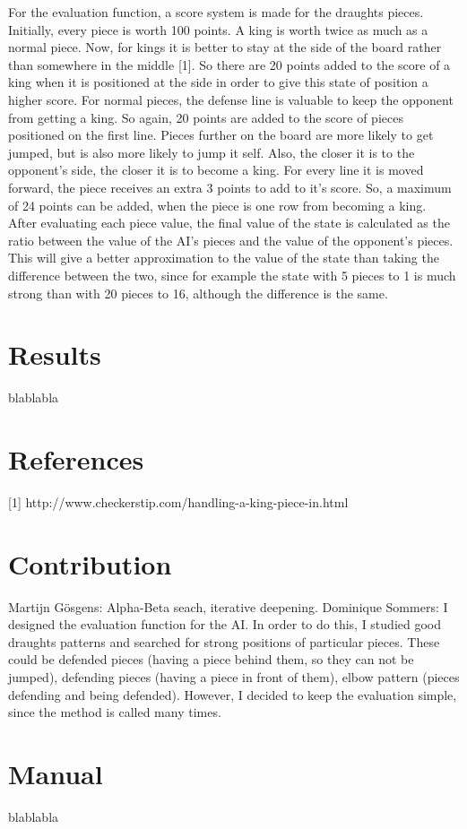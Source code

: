 \documentclass[a4paper,twoside,11pt]{article}
\begin{document}
For the evaluation function, a score system is made for the draughts pieces. Initially, every piece is worth 100 points. A king is worth twice as much as a normal piece. Now, for kings it is better to stay at the side of the board rather than somewhere in the middle [1]. So there are 20 points added to the score of a king when it is positioned at the side in order to give this state of position a higher score.
For normal pieces, the defense line is valuable to keep the opponent from getting a king. So again, 20 points are added to the score of pieces positioned on the first line. Pieces further on the board are more likely to get jumped, but is also more likely to jump it self. Also, the closer it is to the opponent's side, the closer it is to become a king. For every line it is moved forward, the piece receives an extra 3 points to add to it's score. So, a maximum of 24 points can be added, when the piece is one row from becoming a king.\\
After evaluating each piece value, the final value of the state is calculated as the ratio between the value of the AI's pieces and the value of the opponent's pieces. This will give a better approximation to the value of the state than taking the difference between the two, since for example the state with 5 pieces to 1 is much strong than with 20 pieces to 16, although the difference is the same. 

\section{Results}
blablabla

\section{References}
[1] http://www.checkerstip.com/handling-a-king-piece-in.html

\section{Contribution}
Martijn Gösgens: Alpha-Beta seach, iterative deepening.
Dominique Sommers: I designed the evaluation function for the AI. In order to do this, I studied good draughts patterns and searched for strong positions of particular pieces. These could be defended pieces (having a piece behind them, so they can not be jumped), defending pieces (having a piece in front of them), elbow pattern (pieces defending and being defended). However, I decided to keep the evaluation simple, since the method is called many times.

\section{Manual}
blablabla
\end{document}
